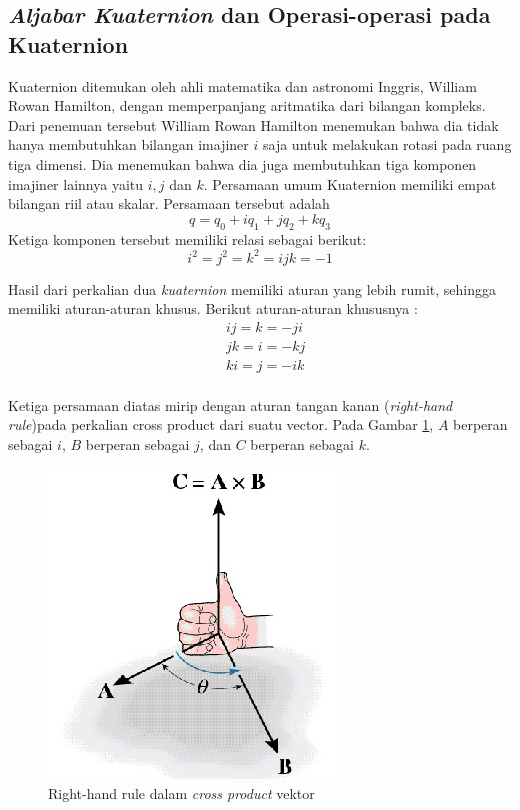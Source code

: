 \subsection{\textit{Aljabar Kuaternion} dan Operasi-operasi pada Kuaternion}
\cite{kuipers:1999}
Kuaternion ditemukan oleh ahli matematika dan astronomi Inggris, William Rowan Hamilton, dengan memperpanjang aritmatika dari bilangan kompleks. Dari penemuan tersebut William Rowan Hamilton menemukan bahwa dia tidak hanya membutuhkan bilangan imajiner \(i\) saja untuk melakukan rotasi pada ruang tiga dimensi. Dia menemukan bahwa dia juga membutuhkan tiga komponen imajiner lainnya yaitu \(i,j\) dan \(k\). Persamaan umum Kuaternion memiliki empat bilangan riil atau skalar. Persamaan tersebut adalah 
\[
	q = q_0 + i q_1 + j q_2 + k q_3
\]
Ketiga komponen tersebut memiliki relasi sebagai berikut:
\[
	i^2 = j^2 = k^2 = ijk = -1
\]

Hasil dari perkalian dua \textit{kuaternion} memiliki aturan yang lebih rumit, sehingga memiliki aturan-aturan khusus. Berikut aturan-aturan khususnya :
\begin{equation}
	\begin{split}
	& ij = k = -ji\\
	& jk = i = -kj\\
	& ki = j = -ik	
	\end{split}
\label{eq:persamaan_khusus_aturan_quaternion}
\end{equation}\\
Ketiga persamaan diatas mirip dengan aturan tangan kanan (\textit{right-hand rule})pada perkalian cross product dari suatu vector. Pada Gambar \ref{fig:right-hand-rule}, \(A\) berperan sebagai \(i\), \(B\) berperan sebagai \(j\), dan \(C\) berperan sebagai \(k\).\\
\begin{figure}[htbp]
\centering
\includegraphics[scale=1]{Gambar/right-hand-rule}
\caption{Right-hand rule dalam \textit{cross product} vektor} 
\label{fig:right-hand-rule}
\end{figure}\\
